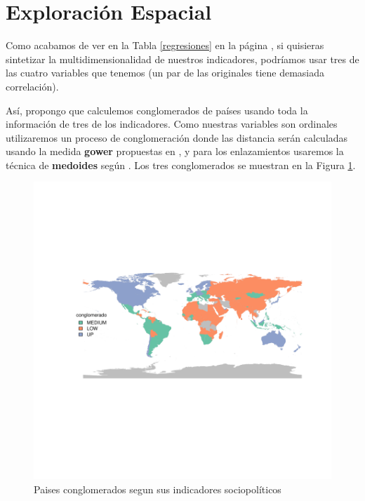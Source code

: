 \documentclass{article}
\begin{document}
\clearpage

\section{Exploración Espacial}

Como acabamos de ver en la Tabla \ref{regresiones} en la página \pageref{regresiones}, si quisieras sintetizar la multidimensionalidad de nuestros indicadores, podríamos usar tres de las cuatro variables que tenemos (un par de las originales tiene demasiada correlación). 

Así, propongo que calculemos conglomerados de países usando toda la información de tres de los indicadores. Como nuestras variables son ordinales utilizaremos un proceso de conglomeración donde las distancia serán calculadas usando la medida {\bf gower} propuestas en \cite{gower_general_1971}, y para los enlazamientos usaremos la técnica de {\bf medoides} según \cite{reynolds_clustering_2006}. Los tres conglomerados se muestran en la Figura \ref{clustmap}.






\begin{figure}[h]
\centering
\begin{adjustbox}{width=11cm,height=8cm,clip,trim=1cm 2.5cm 0cm 2.5cm}
\includegraphics{paperVersion_6-plotMap1}
\end{adjustbox}
\caption{Paises conglomerados segun sus indicadores sociopolíticos}\label{clustmap}
\end{figure}

\renewcommand{\refname}{Bibliografia}

\end{document}
